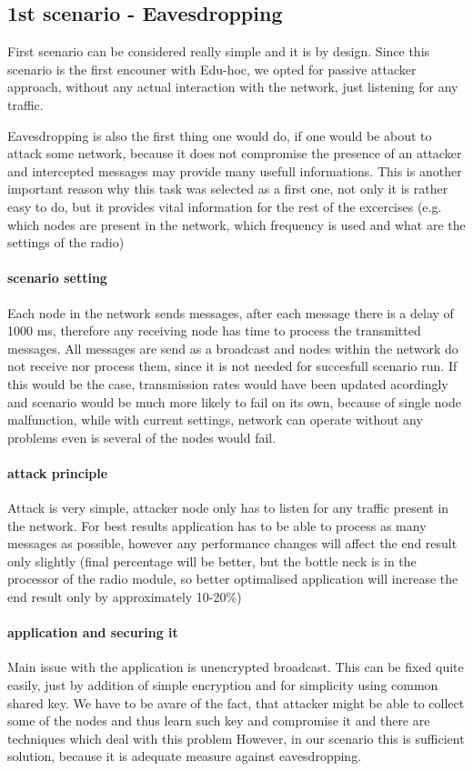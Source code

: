 \documentclass[
  digital, %
  table,   %
  nolof,     %
  nolot,     %
           oneside
]{fithesis3}
\begin{document}
    \subsection{1st scenario - Eavesdropping}
    First scenario can be considered really simple and it is by design. Since this scenario is the first encouner with Edu-hoc, we opted for passive attacker approach, without any actual interaction with the network, just listening for any traffic.

    Eavesdropping is also the first thing one would do, if one would be about to attack some network, because it does not compromise the presence of an attacker and intercepted messages may provide many usefull informations. This is another important reason why this task was selected as a first one, not only it is rather easy to do, but it provides vital information for the rest of the excercises (e.g. which nodes are present in the network, which frequency is used and what are the settings of the radio)

    \paragraph{scenario setting}
    Each node in the network sends messages, after each message there is a delay of 1000 ms, therefore any receiving node has time to process the transmitted messages. All messages are send as a broadcast and nodes within the network do not receive nor process them, since it is not needed for succesfull scenario run. If this would be the case, transmission rates would have been updated acordingly and scenario would be much more likely to fail on its own, because of single node malfunction, while with current settings, network can operate without any problems even is several of the nodes would fail.

    \paragraph{attack principle}
    Attack is very simple, attacker node only has to listen for any traffic present in the network. For best results application has to be able to process as many messages as possible, however any performance changes will affect the end result only slightly (final percentage will be better, but the bottle neck is in the processor of the radio module, so better optimalised application will increase the end result only by approximately 10-20\%)
    \paragraph{application and securing it}
    Main issue with the application is unencrypted broadcast. This can be fixed quite easily, just by addition of simple encryption and for simplicity using common shared key. We have to be avare of the fact, that attacker might be able to collect some of the nodes and thus learn such key and compromise it and there are techniques which deal with this problem %
    However, in our scenario this is sufficient solution, because it is adequate measure against eavesdropping.
\end{document}
